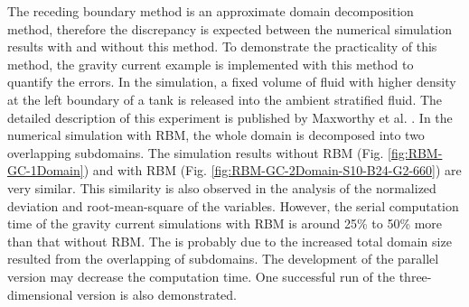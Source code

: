 The receding boundary method is an approximate domain decomposition method, therefore the discrepancy is expected between the numerical simulation results with and without this method. To demonstrate the practicality of this method, the gravity current example is implemented with this method to quantify the errors. In the simulation, a fixed volume of fluid with higher density at the left boundary of a tank is released into the ambient stratified fluid. The detailed description of this experiment is published by Maxworthy et al. \cite{Maxworthy02}. In the numerical simulation with RBM, the whole domain is decomposed into two overlapping subdomains. The simulation results without RBM (Fig. \ref{fig:RBM-GC-1Domain}) and with RBM (Fig. \ref{fig:RBM-GC-2Domain-S10-B24-G2-660}) are very similar. This similarity is also observed in the analysis of the normalized deviation and root-mean-square of the variables.
However, the serial computation time of the gravity current simulations with RBM is around 25\% to 50\% more than that without RBM. The is probably due to the increased total domain size resulted from the overlapping of subdomains. The development of the parallel version may decrease the computation time. One successful run of the three-dimensional version is also demonstrated.







